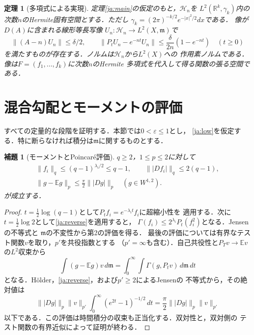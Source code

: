 \documentclass[12pt]{amsart}
\theoremstyle{definition}
\theoremstyle{remark}
\numberwithin{equation}{section}
\newcommand{\R}{\mathbb{R}}
\newcommand{\dm}{\,d\mathfrak m}
\newcommand{\E}{\mathbb E}
\newcommand{\gauss}{\gamma_k}
\newcommand{\eps}{\varepsilon}
\theoremstyle{plain}
\newtheorem{jathm}[thm]{定理}
\newtheorem{jalem}[thm]{補題}
\begin{document}
\begin{jathm}[多項式による実現]\label{ja:realization}
定理\ref{ja:main}の仮定のもと，$\mathcal H_n$を
$L^2(\R^k,\gauss)$内の次数$n$のHermite固有空間とする．ただし
$\gauss=(2\pi)^{-k/2}e^{-|x|^2/2}dx$である．
像が$D(A)$に含まれる線形等長写像
$U_n:\mathcal H_n\to L^2(X,\mathfrak m)$で
\begin{equation}\label{ja:realizationeq}
 \|(A-n)U_n\|\leq\delta/2,\qquad
 \|P_tU_n-e^{-nt}U_n\|\leq\frac{\delta}{2n}(1-e^{-nt})
 \quad(t\geq0)
\end{equation}
を満たすものが存在する．ノルムは$\mathcal H_n$から$L^2(X)$への
作用素ノルムである．像は$F=(f_1,\ldots,f_k)$に次数$n$のHermite
多項式を代入して得る関数の張る空間である．
\end{jathm}

\section{混合勾配とモーメントの評価}
すべての定量的な段階を証明する．本節では$0<\eps\leq1$とし，
\eqref{ja:low}を仮定する．特に断らなければ積分は$\mathfrak m$に関するものとする．

\begin{jalem}[モーメントとPoincar\'e評価]\label{ja:integrability}
$q\geq2$，$1\leq p\leq2$に対して
\begin{equation}\label{ja:integrabilityeq}
 \begin{gathered}
 \|f_i\|_q\leq(q-1)^{\lambda_i/2}\leq q-1,
 \qquad \||Df_i|\|_q\leq2(q-1),\\
 \|g-\E g\|_p\leq\frac\pi2\||Dg|\|_p
 \quad(g\in W^{1,2}).
 \end{gathered}
\end{equation}
が成立する．
\end{jalem}
\begin{proof}
$t=\frac12\log(q-1)$として$P_tf_i=e^{-\lambda_it}f_i$に超縮小性を
適用する．次に$t=\frac12\log2$として\eqref{ja:reverse}を適用すると，
$\Gamma(f_i)\leq2^{\lambda_i}P_t(f_i^2)$となる．Jensenの不等式と
$\mathfrak m$の不変性から第2の評価を得る．
最後の評価については有界なテスト関数$v$を取り，$p'$を共役指数とする
（$p'=\infty$も含む）．自己共役性と$P_Tv\to\E v$の$L^2$収束から
\[
 \int(g-\E g)v\dm=\int_0^\infty\int\Gamma(g,P_tv)\dm\,dt
\]
となる．H\"older，\eqref{ja:reverse}，および$p'\geq2$によるJensenの
不等式から，その絶対値は
\[
 \||Dg|\|_p\|v\|_{p'}
 \int_0^\infty(e^{2t}-1)^{-1/2}\,dt
 =\frac\pi2\||Dg|\|_p\|v\|_{p'}
\]
以下である．この評価は時間積分の収束も正当化する．双対性と，双対側の
テスト関数の有界近似によって証明が終わる．
\end{proof}
\end{document}
